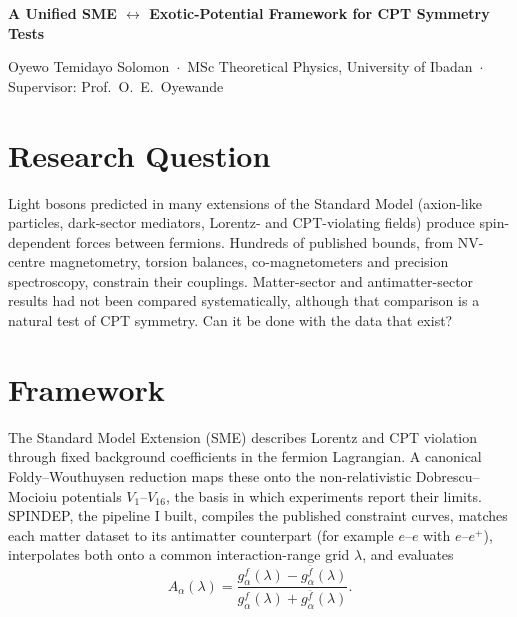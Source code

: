 \documentclass[10pt,a4paper]{article}
\newcommand{\fbar}{\bar f}
\begin{document}
\begin{center}
  {\Large\bfseries A Unified SME $\leftrightarrow$ Exotic-Potential Framework
  for CPT Symmetry Tests\par}
  \vspace{3pt}
  {\small\color{muted} Oyewo Temidayo Solomon \,$\cdot$\, MSc Theoretical
  Physics, University of Ibadan \,$\cdot$\, Supervisor: Prof.\ O.\ E.\
  Oyewande\par}
\end{center}

\section*{Research Question}
Light bosons predicted in many extensions of the Standard Model (axion-like
particles, dark-sector mediators, Lorentz- and CPT-violating fields) produce
spin-dependent forces between fermions. Hundreds of published bounds, from
NV-centre magnetometry, torsion balances, co-magnetometers and precision
spectroscopy, constrain their couplings. Matter-sector and antimatter-sector
results had not been compared systematically, although that comparison is a
natural test of CPT symmetry. Can it be done with the data that exist?

\section*{Framework}
The Standard Model Extension (SME) describes Lorentz and CPT violation through
fixed background coefficients in the fermion Lagrangian. A canonical
Foldy--Wouthuysen reduction maps these onto the non-relativistic
Dobrescu--Mocioiu potentials $V_1$--$V_{16}$, the basis in which experiments
report their limits. SPINDEP, the pipeline I built, compiles the published
constraint curves, matches each matter dataset to its antimatter counterpart
(for example $e$--$e$ with $e$--$e^+$), interpolates both onto a common
interaction-range grid $\lambda$, and evaluates
\[
  A_\alpha(\lambda)
  = \frac{g^{f}_\alpha(\lambda) - g^{\fbar}_\alpha(\lambda)}
         {g^{f}_\alpha(\lambda) + g^{\fbar}_\alpha(\lambda)} .
\]
\end{document}
